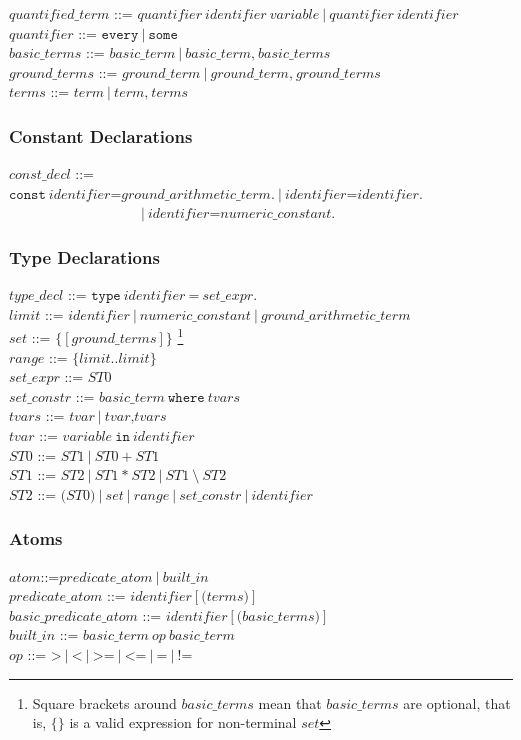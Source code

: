 \documentclass[a4paper,10pt]{article}
\begin{document}
\noindent
$quantified\_term$ ::= $quantifier~identifier~variable~|~quantifier~identifier$\\
$quantifier$ ::= $\texttt{every}~|~\texttt{some}$ \\
$basic\_terms$ ::= $basic\_term~|~basic\_term\texttt{,} ~basic\_terms$ \\
$ground\_terms$ ::= $ground\_term~|~ground\_term\texttt{,} ~ground\_terms$ \\
$terms$ ::= $term~|~term\texttt{,}~ terms$ \\

\subsubsection{Constant Declarations}
$const\_decl$ ::= $\texttt{const} ~identifier \texttt{=} ground\_arithmetic\_term.~|~identifier \texttt{=} identifier.~$\\
~~~~~~~~~~$~~~~~~~~~~~~~~~~~~~~|~identifier \texttt{=} numeric\_constant.$
\subsubsection{Type Declarations}

$type\_decl$ ::= $\texttt{type}~identifier~ \texttt{=} ~set\_expr.$\\
$limit$ ::= $identifier~|~numeric\_constant~|~ground\_arithmetic\_term$\\
$set$ ::= $\texttt{\{} [ground\_terms] \texttt{\}}$ \footnote{Square brackets around $basic\_terms$ mean that $basic\_terms$ are optional, that is, $\{ \}$  is a valid expression for non-terminal $set$}\\
$range$ ::= $\texttt{\{}limit..limit\texttt{\}}$\\
$set\_expr$ ::= $ST0$ \\  
$set\_constr$ ::= $basic\_term~\texttt{where}~tvars $\\
$tvars$ ::= $tvar~|~tvar\texttt{,} tvars$\\
$tvar$ ::= $variable~\texttt{in}~identifier$  \\
$ST0$ ::= $ST1~|~ST0~\texttt{+}~ST1$\\
$ST1$ ::= $ST2~|~ST1~\texttt{*}~ST2~|~ST1~\texttt{\textbackslash}~ST2$ \\
$ST2$ ::= $\texttt{(}ST0\texttt{)}~|~set~|~range~|~set\_constr~|~identifier$  \\


\subsubsection{Atoms}
$atom$::=$predicate\_atom~|~built\_in $\\
$predicate\_atom$ ::= $identifier [\texttt{(} terms \texttt{)}]$\\
$basic\_predicate\_atom$ ::= $identifier [\texttt{(} basic\_terms \texttt{)}]$\\
$built\_in$ ::= $ basic\_term~op~basic\_term$\\
$op$ ::= $\texttt{>}~|~\texttt{<}~|~\texttt{>=}~|~\texttt{<=}~|~\texttt{=}~|~\texttt{!=}$ \\
\end{document}
